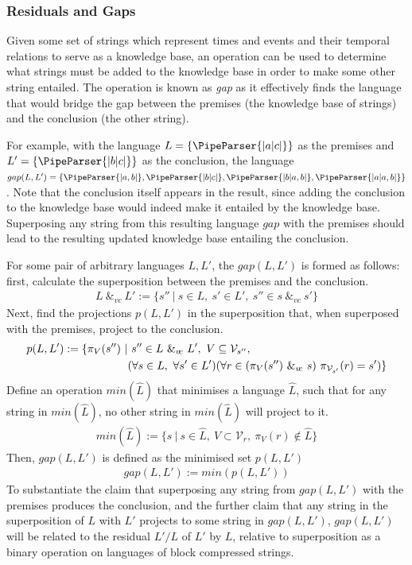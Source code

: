 \documentclass[a4paper,12pt,leqno]{article}
\newcommand{\vph}[1]{\vphantom{#1}}
\newcommand{\ebox}[1]{\fbox{$\vph{'(),}#1$}}
\newcommand{\spvc}{~\&_{v\!c}~}
\newcommand{\V}{\mathcal{V}}
\newcommand{\EventString}[1]{%
	\renewcommand*{\do}[1]{\ebox{##1}}%
	\PipeParser{#1}%
}
\begin{document}
\subsubsection{Residuals and Gaps}\label{ssub:residuals}
Given some set of strings which represent times and events and their temporal relations to serve as a knowledge base, an operation can be used to determine what strings must be added to the knowledge base in order to make some other string entailed. The operation is known as \textit{gap} as it effectively finds the language that would bridge the gap between the premises (the knowledge base of strings) and the conclusion (the other string).

For example, with the language $L = \{\EventString{{}|a|c|{}}\}$ as the premises and $L' = \{\EventString{{}|b|c|{}}\}$ as the conclusion, the language $gap(L, L') = \{\EventString{{}|a,b|{}}, \EventString{{}|b|c|{}}, \EventString{{}|b|a,b|{}}, \EventString{{}|a|a,b|{}}\}$. Note that the conclusion itself appears in the result, since adding the conclusion to the knowledge base would indeed make it entailed by the knowledge base. Superposing any string from this resulting language $gap$ with the premises should lead to the resulting updated knowledge base entailing the conclusion.

For some pair of arbitrary languages $L, L'$, the $gap(L,L')$ is formed as follows: first, calculate the superposition between the premises and the conclusion.
\begin{align}
	L \spvc L' := \{ s'' ~|~ s \in L,~ s' \in L',~ s'' \in s \spvc s'\}
\end{align}
Next, find the projections $p(L, L')$ in the superposition that, when superposed with the premises, project to the conclusion.
\begin{align}
	p(L, L') := \{\pi_V(s'') ~|&~ s'' \in L \spvc L',~ V \subseteq \V_{s''},\\
	&(\forall s \in L,~\forall s' \in L')(\forall r \in (\pi_V(s'') \spvc s)~ \pi_{\V_{s'}}(r) = s') \}\notag
\end{align}
Define an operation $min(\hat{L})$ that minimises a language $\hat{L}$, such that for any string in $min(\hat{L})$, no other string in $min(\hat{L})$ will project to it.
\begin{align}
	min(\hat{L}) := \{s ~|~ s \in \hat{L}, ~V \subset \V_r, ~\pi_V(r) \notin \hat{L} \}
\end{align}
Then, $gap(L, L')$ is defined as the minimised set $p(L,L')$
\begin{align}
	gap(L, L') := min(p(L, L'))\label{def:gap}
\end{align}
To substantiate the claim that superposing any string from $gap(L,L')$ with the premises produces the conclusion, and the further claim that any string in the superposition of $L$ with $L'$ projects to some string in $gap(L, L')$, $gap(L, L')$ will be related to the residual $L'/L$ of $L'$ by $L$, relative to superposition as a binary operation on languages of block compressed strings.
\end{document}
